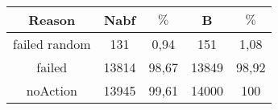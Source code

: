 \documentclass{article}
\begin{document}
\begin{tabular}{|c||c|c||c|c|}
\hline
Reason&Nabf& $\%$&B& $\%$\\
\hline
failed random&131&0,94&151&1,08\\

failed&13814&98,67&13849&98,92\\

noAction&13945&99,61&14000&100\\
\hline
\end{tabular}
\end{document}
